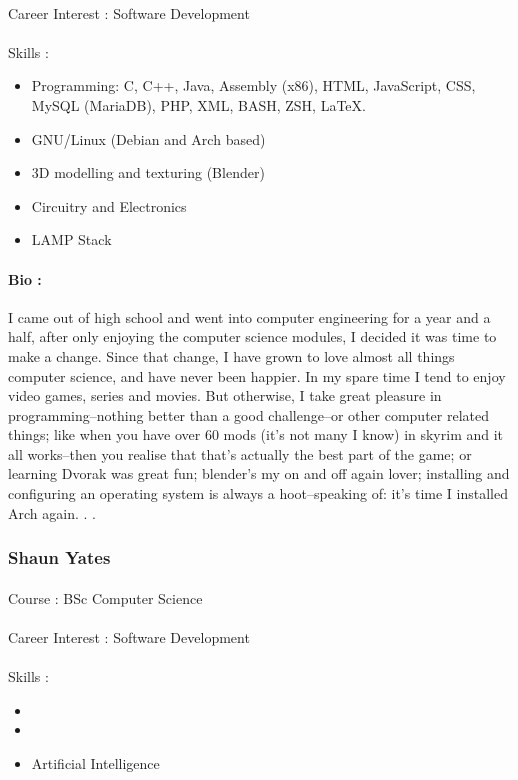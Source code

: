 \documentclass[11pt]{article}
\begin{document}
\paragraph{}Career Interest : Software Development
\paragraph{}Skills : 
\begin{itemize}
\item Programming: C, C++, Java, Assembly (x86), HTML, JavaScript, CSS, MySQL (MariaDB), PHP, XML, BASH, ZSH, LaTeX.
\item GNU/Linux (Debian and Arch based)
\item 3D modelling and texturing (Blender)
\item Circuitry and Electronics
\item LAMP Stack
\end{itemize}
\paragraph{Bio :} I came out of high school and went into computer engineering for a year and a half, after only enjoying the computer science modules, I decided it was time to make a change. Since that change, I have grown to love almost all things computer science, and have never been happier.
In my spare time I tend to enjoy video games, series and movies. But otherwise, I take great pleasure in programming--nothing better than a good challenge--or other computer related things; like when you have over 60 mods (it's not many I know) in skyrim and it all works--then you realise that that's actually the best part of the game; or learning Dvorak was great fun; blender's my on and off again lover; installing and configuring an operating system is always a hoot--speaking of: it's time I installed Arch again. . .


\subsubsection{Shaun Yates}
\paragraph{}Course : BSc Computer Science
\paragraph{}Career Interest : Software Development
\paragraph{}Skills : 
\begin{itemize}
\item 
\item 
\item Artificial Intelligence
\end{itemize}
\end{document}
